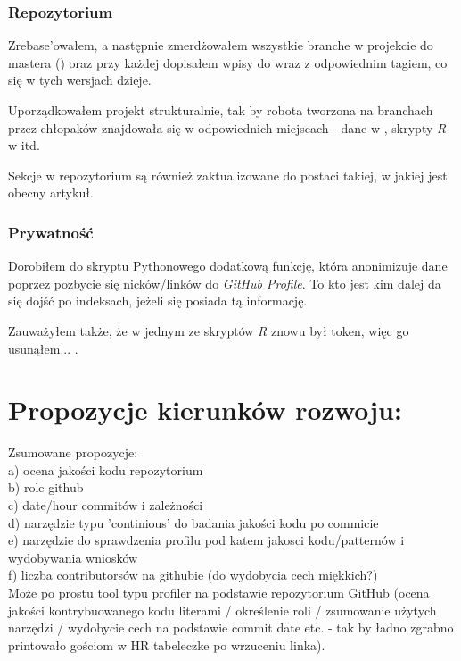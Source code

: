 \documentclass[graybox]{svmult}
\begin{document}
\subsubsection{Repozytorium}

Zrebase'owałem, a następnie zmerdżowałem wszystkie branche w projekcie do mastera () oraz przy każdej dopisałem wpisy do  wraz z odpowiednim tagiem, co się w tych wersjach dzieje.

Uporządkowałem projekt strukturalnie, tak by robota tworzona na branchach przez chłopaków znajdowała się w odpowiednich miejscach - dane w , skrypty \emph{R} w  itd.

Sekcje w repozytorium są również zaktualizowane do postaci takiej, w jakiej jest obecny artykuł.

\subsubsection{Prywatność}

Dorobiłem do skryptu Pythonowego  dodatkową funkcję, która anonimizuje dane poprzez pozbycie się nicków/linków do \emph{GitHub Profile}. To kto jest kim dalej da się dojść po indeksach, jeżeli się posiada tą informację.

Zauważyłem także, że w jednym ze skryptów \emph{R} znowu był token, więc go usunąłem... . 

\newpage


\section{Propozycje kierunków rozwoju:}
Zsumowane propozycje: \\
 a) ocena jakości kodu repozytorium \\
 b) role github \\
 c) date/hour commitów i zależności \\ 
 d) narzędzie typu 'continious' do badania jakości kodu po commicie \\ 
 e) narzędzie do sprawdzenia profilu pod katem jakosci kodu/patternów i wydobywania wniosków \\
 f) liczba contributorsów na githubie (do wydobycia cech miękkich?) \\ 

Może po prostu tool typu profiler na podstawie repozytorium GitHub (ocena jakości kontrybuowanego kodu literami / określenie roli / zsumowanie użytych narzędzi / wydobycie cech na podstawie commit date etc. - tak by ładno zgrabno printowało gościom w HR tabeleczke po wrzuceniu linka).
\end{document}
